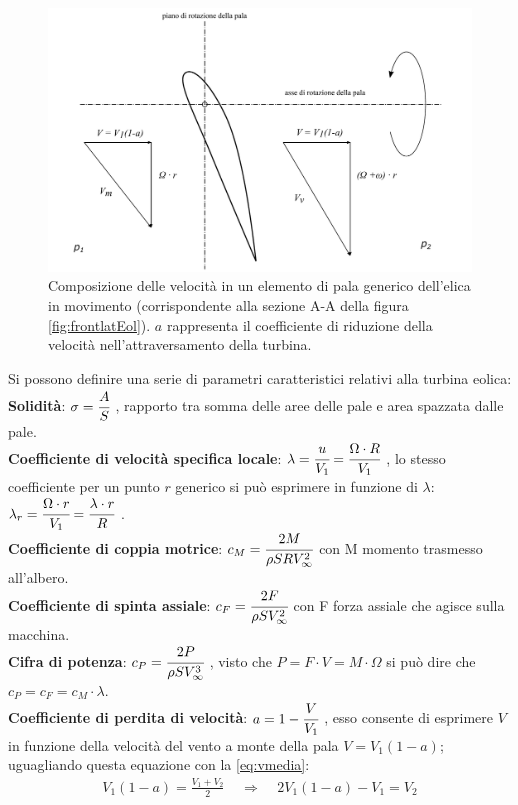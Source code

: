 \begin{figure}
\centering
  \includegraphics[width=\textwidth]{fig/triangEol.pdf}
\caption{Composizione delle velocità in un elemento di pala generico dell'elica in movimento (corrispondente alla sezione A-A della figura \ref{fig:frontlatEol}). $a$ rappresenta il coefficiente di riduzione della velocità nell'attraversamento della turbina.}
\label{fig:triangEol}
\end{figure}
Si possono definire una serie di parametri caratteristici relativi alla turbina eolica:\\[1mm]
\textbf{Solidità}: $\sigma=\cfrac{A}{S}$ , rapporto tra somma delle aree delle pale e area spazzata dalle pale.\\
\textbf{Coefficiente di velocità specifica locale}: $\lambda=\cfrac{u}{V_1}=\cfrac{\Omega \cdot R}{V_1}$ , lo stesso coefficiente per un punto $r$ generico si può esprimere in funzione di $\lambda$: $\lambda_r = \cfrac{\Omega \cdot r}{V_1} = \cfrac{\lambda \cdot r}{R}$ .\\
\textbf{Coefficiente di coppia motrice}: $c_M=\cfrac{2M}{\rho S R V_\infty^2}$ con M momento trasmesso all'albero.\\
\textbf{Coefficiente di spinta assiale}: $c_F=\cfrac{2F}{\rho S V_\infty^2}$ con F forza assiale che agisce sulla macchina.\\
\textbf{Cifra di potenza}: $c_P=\cfrac{2P}{\rho S V_\infty^3}$ , visto che $P = F \cdot V = M\cdot \Omega$ si può dire che $c_P=c_F=c_M \cdot \lambda$.\\
\textbf{Coefficiente di perdita di velocità}: $a=1-\cfrac{V}{V_1}$ , esso consente di esprimere $V$ in funzione della velocità del vento a monte della pala $V=V_1 (1-a)$; uguagliando questa equazione con la \ref{eq:vmedia}:
\begin{align*}
V_1 (1-a) = \frac{V_1 +V_2}{2} \;\;\;\; \Rightarrow \;\;\;\; 2 V_1 (1-a) - V_1 = V_2
\end{align*}

